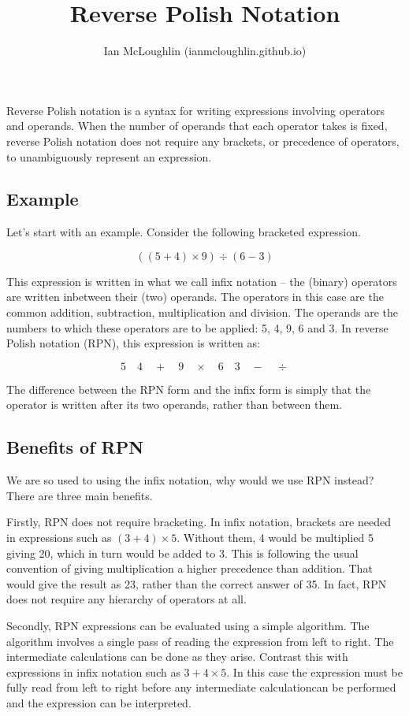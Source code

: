 \documentclass[twocolumn]{iagproc}
\title{Reverse Polish Notation}
\author{Ian McLoughlin (ianmcloughlin.github.io)}
\begin{document}
\maketitle
\noindent
Reverse Polish notation is a syntax for writing expressions involving operators and operands.
When the number of operands that each operator takes is fixed, reverse Polish notation does not require any brackets, or precedence of operators, to unambiguously represent an expression.

\subsection*{Example}
Let’s start with an example.
Consider the following bracketed expression.

$$ ((5 + 4) \times 9) \div (6 - 3) $$

This expression is written in what we call infix notation -- the (binary) operators are written inbetween their (two) operands.
The operators in this case are the common addition, subtraction, multiplication and division.
The operands are the numbers to which these operators are to be applied: 5, 4, 9, 6 and 3.
In reverse Polish notation (RPN), this expression is written as:

$$ 5 \quad 4 \quad + \quad 9 \quad \times \quad  6 \quad 3 \quad - \quad \div $$

The difference between the RPN form and the infix form is simply that the operator is written after its two operands, rather than between them.

\subsection*{Benefits of RPN}
We are so used to using the infix notation, why would we use RPN instead?
There are three main benefits.

Firstly, RPN does not require bracketing.
In infix notation, brackets are needed in expressions such as $(3 + 4) \times 5$.
Without them, 4 would be multiplied 5 giving 20, which in turn would be added to 3.
This is following the usual convention of giving multiplication a higher precedence than addition.
That would give the result as 23, rather than the correct answer of 35.
In fact, RPN does not require any hierarchy of operators at all.

Secondly, RPN expressions can be evaluated using a simple algorithm.
The algorithm involves a single pass of reading the expression from left to right.
The intermediate calculations can be done as they arise.
Contrast this with expressions in infix notation such as $3 + 4 \times 5$.
In this case the expression must be fully read from left to right before any intermediate calculationcan be performed and the expression can be interpreted.
\end{document}
